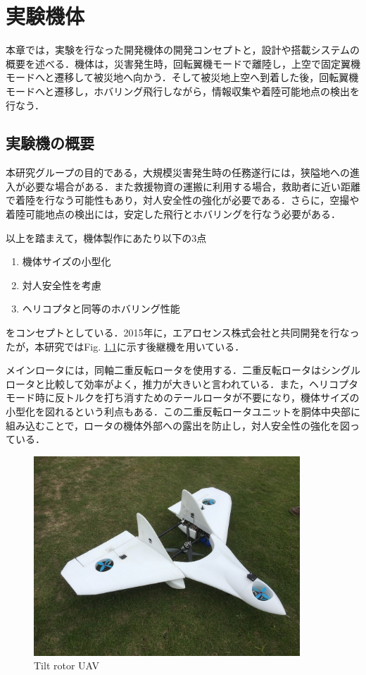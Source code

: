 
\chapter{実験機体}
\label{aircraft}

本章では，実験を行なった開発機体の開発コンセプトと，設計や搭載システムの概要を述べる．機体は，災害発生時，回転翼機モードで離陸し，上空で固定翼機モードへと遷移して被災地へ向かう．そして被災地上空へ到着した後，回転翼機モードへと遷移し，ホバリング飛行しながら，情報収集や着陸可能地点の検出を行なう．

\section{実験機の概要}
本研究グループの目的である，大規模災害発生時の任務遂行には，狭隘地への進入が必要な場合がある．また救援物資の運搬に利用する場合，救助者に近い距離で着陸を行なう可能性もあり，対人安全性の強化が必要である．さらに，空撮や着陸可能地点の検出には，安定した飛行とホバリングを行なう必要がある．

以上を踏まえて，機体製作にあたり以下の3点
	\begin{enumerate}
	\item 機体サイズの小型化
	\item 対人安全性を考慮
	\item ヘリコプタと同等のホバリング性能
	\end{enumerate}
をコンセプトとしている．2015年に，エアロセンス株式会社と共同開発を行なったが，本研究ではFig. \ref{fig:vtol23k}に示す後継機を用いている．

\hspace{5pt}

メインロータには，同軸二重反転ロータを使用する．二重反転ロータはシングルロータと比較して効率がよく，推力が大きいと言われている．また，ヘリコプタモード時に反トルクを打ち消すためのテールロータが不要になり，機体サイズの小型化を図れるという利点もある．この二重反転ロータユニットを胴体中央部に組み込むことで，ロータの機体外部への露出を防止し，対人安全性の強化を図っている．

\begin{figure}[H]
	\centering
	\includegraphics[clip,width=10.0cm,bb=0 0 1478 1108]{./z_figure_files/chapter2/1_vtol23K.JPG}
	\caption{Tilt rotor UAV}
	\label{fig:vtol23k}
\end{figure}

